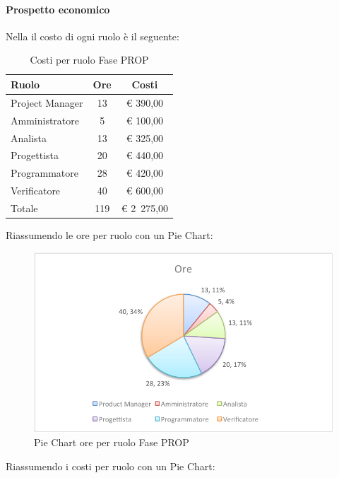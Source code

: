 			\paragraph{Prospetto economico}
				Nella  il costo di ogni ruolo è il seguente:
				\begin{table}[H]
					\begin{center}
						\begin{tabular}{| l | c | c |}
							\hline
							Ruolo 			& Ore 		& Costi  \\ \hline
							
							Project Manager	& 13 		& \euro{} 390,00 	\\
							Amministratore 		& 5 		& \euro{} 100,00 	\\
							Analista	 		& 13 		& \euro{} 325,00 	\\
							Progettista 		& 20 		& \euro{} 440,00  	\\
							Programmatore		& 28 		& \euro{} 420,00 	\\
							Verificatore		& 40 		& \euro{} 600,00 	\\ \hline \hline
							
							Totale	 		& 119 	& \euro{} 2~275,00 	\\ \hline
						\end{tabular}
					\end{center}
					\caption{Costi per ruolo Fase PROP}
				\end{table}
				Riassumendo le ore per ruolo con un Pie Chart:
				\begin{figure}[H]\centering
					\includegraphics[width=\textwidth]{PianoDiProgetto/Pics/ChartTotOreFasePROP.pdf}
					\caption{Pie Chart ore per ruolo Fase PROP}
				\end{figure}
				Riassumendo i costi per ruolo con un Pie Chart:
